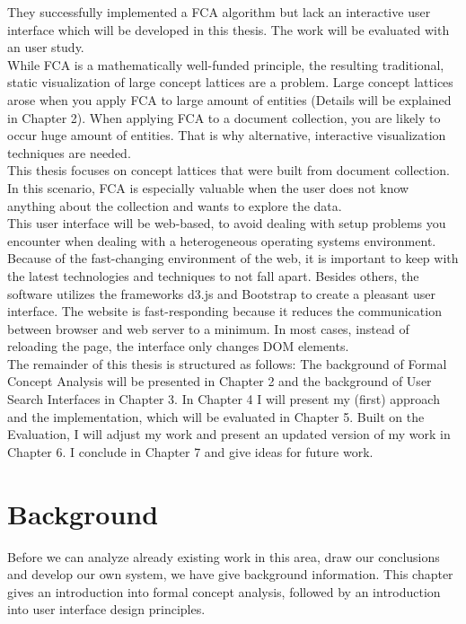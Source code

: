 \documentclass[11pt]{report}
\begin{document}
 They successfully implemented a FCA algorithm but lack an interactive user interface which will be developed in this thesis. The work will be evaluated with an user study. \\
   
 While FCA is a mathematically well-funded principle, the resulting traditional, static visualization of large concept lattices are a problem. Large concept lattices arose when you apply FCA to large amount of entities (Details will be explained in Chapter 2). When applying FCA to a document collection, you are likely to occur huge amount of entities. That is why alternative, interactive visualization techniques are needed. \\
 
  This thesis focuses on concept lattices that were built from document collection. In this scenario, FCA is especially valuable when the user does not know anything about the collection and wants to explore the data. \\
  
 This user interface will be web-based, to avoid dealing with setup problems you encounter when dealing with a heterogeneous operating systems environment. Because of the fast-changing environment of the web, it is important to keep with the latest technologies and techniques to not fall apart. Besides others, the software utilizes the frameworks d3.js and Bootstrap to create a pleasant user interface. The website is fast-responding because it reduces the communication between browser and web server to a minimum. In most cases, instead of reloading the page, the interface only changes DOM elements. \\
    
 The remainder of this thesis is structured as follows: The background of Formal Concept Analysis will be presented in Chapter 2 and the background of User Search Interfaces in Chapter 3. In Chapter 4 I will present my (first) approach and the implementation, which will be evaluated in Chapter 5. Built on the Evaluation, I will adjust my work and present an updated version of my work in Chapter 6. I conclude in Chapter 7 and give ideas for future work.
 
\chapter{Background}

Before we can analyze already existing work in this area, draw our conclusions and develop our own system, we have give background information. This chapter gives an introduction into formal concept analysis, followed by an introduction into user interface design principles.
\end{document}
